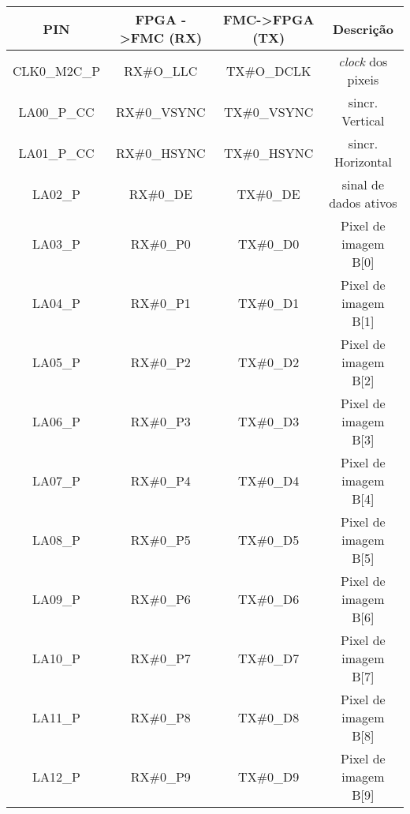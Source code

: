 \begin{table}[h!]
	\centering
	\begin{tabular}{|c|c|c|c|}
		\hline
		\textbf{PIN} & \textbf{FPGA -\textgreater FMC (RX)} & \textbf{FMC->FPGA (TX)} & \textbf{Descrição}       \\ \hline
		CLK0\_M2C\_P & RX\#O\_LLC                           & TX\#O\_DCLK                        & \textit{clock} dos pixeis         \\ \hline
		LA00\_P\_CC  & RX\#0\_VSYNC                         & TX\#0\_VSYNC                       & sincr. Vertical          \\ \hline
		LA01\_P\_CC  & RX\#0\_HSYNC                         & TX\#0\_HSYNC                       & sincr. Horizontal        \\ \hline
		LA02\_P      & RX\#0\_DE                            & TX\#0\_DE                          & sinal de dados ativos    \\ \hline
		LA03\_P      & RX\#0\_P0                            & TX\#0\_D0                          & Pixel de imagem B{[}0{]} \\ \hline
		LA04\_P      & RX\#0\_P1                            & TX\#0\_D1                          & Pixel de imagem B{[}1{]} \\ \hline
		LA05\_P      & RX\#0\_P2                            & TX\#0\_D2                          & Pixel de imagem B{[}2{]} \\ \hline
		LA06\_P      & RX\#0\_P3                            & TX\#0\_D3                          & Pixel de imagem B{[}3{]} \\ \hline
		LA07\_P      & RX\#0\_P4                            & TX\#0\_D4                          & Pixel de imagem B{[}4{]} \\ \hline
		LA08\_P      & RX\#0\_P5                            & TX\#0\_D5                          & Pixel de imagem B{[}5{]} \\ \hline
		LA09\_P      & RX\#0\_P6                            & TX\#0\_D6                          & Pixel de imagem B{[}6{]} \\ \hline
		LA10\_P      & RX\#0\_P7                            & TX\#0\_D7                          & Pixel de imagem B{[}7{]} \\ \hline
		LA11\_P      & RX\#0\_P8                            & TX\#0\_D8                          & Pixel de imagem B{[}8{]} \\ \hline
		LA12\_P      & RX\#0\_P9                            & TX\#0\_D9                          & Pixel de imagem B{[}9{]} \\ \hline

\end{tabular}
\end{table}
